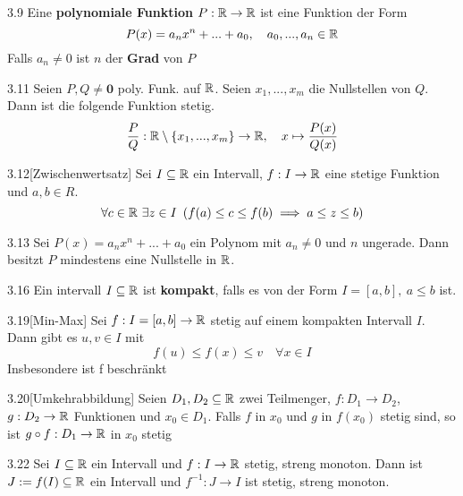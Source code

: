 \begin{definition}{3.9}
    Eine \textbf{polynomiale Funktion} $P: \mathbb{R} \to \mathbb{R}$ ist eine Funktion der Form
    \[ P(x) = a_n x^n + ... + a_0, \quad a_0, ..., a_n \in \mathbb{R} \]
    Falls $a_n \ne 0$ ist $n$ der \textbf{Grad} von $P$
\end{definition}

\begin{korollar}{3.11}
    Seien $P, Q \ne \mathbf{0}$ poly. Funk. auf $\mathbb{R}$. Seien $x_1, ..., x_m$ die Nullstellen von $Q$. Dann ist die folgende Funktion stetig.
    \[ \frac{P}{Q}: \mathbb{R} \setminus \left\{ x_1, ..., x_m \right\} \to \mathbb{R},\quad x \mapsto \frac{P(x)}{Q(x)} \]
\end{korollar}

\begin{satz}{3.12}[Zwischenwertsatz]
    Sei $I \subseteq \mathbb{R}$ ein Intervall, $f: I \to \mathbb{R}$ eine stetige Funktion und $a, b \in R$.
    \[ \forall c \in \mathbb{R} \ \exists z \in I\ \left( f(a) \le c \le f(b) \implies a \le z \le b \right) \]
\end{satz}

\begin{korollar}{3.13}
    Sei $P(x) = a_nx^n + ... + a_0$ ein Polynom mit $a_n \ne 0$ und $n$ ungerade.
    Dann besitzt $P$ mindestens eine Nullstelle in $\mathbb{R}$.
\end{korollar}

\begin{definition}{3.16}
    Ein intervall $I \subseteq \mathbb{R}$ ist \textbf{kompakt}, falls es von der Form $I = [a, b],\ a \le b$ ist.
\end{definition}

\begin{satz}{3.19}[Min-Max] Sei $f: I = [a,b] \to \mathbb{R}$ stetig auf einem kompakten Intervall $I$.
    Dann gibt es $u,v \in I$ mit
    \[ f(u) \le f(x) \le v \quad \forall x \in I \]
    Insbesondere ist f beschränkt
\end{satz}

\begin{satz}{3.20}[Umkehrabbildung]
    Seien $D_1,D_2 \subseteq \mathbb{R}$ zwei Teilmenger, $f: D_1 \to D_2$, $g: D_2 \to \mathbb{R}$ Funktionen und $x_0 \in D_1$.
    Falls $f$ in $x_0$ und $g$ in $f(x_0)$ stetig sind, so ist $g \circ f: D_1 \to \mathbb{R}$ in $x_0$ stetig
\end{satz}

\begin{satz}{3.22}
    Sei $I \subseteq \mathbb{R}$ ein Intervall und $f: I \to \mathbb{R}$ stetig, streng monoton.
    Dann ist $J := f(I) \subseteq \mathbb{R}$ ein Intervall und $f^{-1}: J \to I$ ist stetig, streng monoton.
\end{satz}

